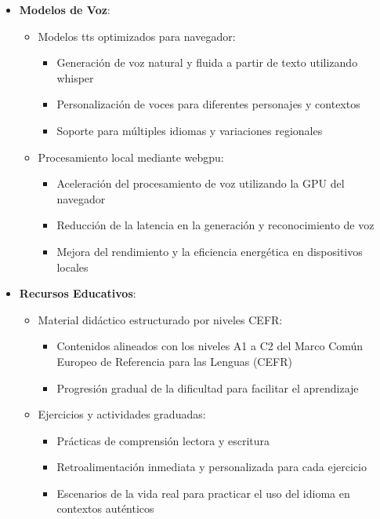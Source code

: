 \begin{itemize}
    \item \textbf{Modelos de Voz}:
        \begin{itemize}
            \item Modelos \gls{tts} optimizados para navegador:
            \begin{itemize}
                \item Generación de voz natural y fluida a partir de texto utilizando \gls{whisper}
                \item Personalización de voces para diferentes personajes y contextos
                \item Soporte para múltiples idiomas y variaciones regionales
            \end{itemize}
            
            \item Procesamiento local mediante \gls{webgpu}:
            \begin{itemize}
                \item Aceleración del procesamiento de voz utilizando la GPU del navegador
                \item Reducción de la latencia en la generación y reconocimiento de voz
                \item Mejora del rendimiento y la eficiencia energética en dispositivos locales
            \end{itemize}
        \end{itemize}
        
        \item \textbf{Recursos Educativos}:
        \begin{itemize}
            \item Material didáctico estructurado por niveles CEFR:
            \begin{itemize}
                \item Contenidos alineados con los niveles A1 a C2 del Marco Común Europeo de Referencia para las Lenguas (CEFR)
                \item Progresión gradual de la dificultad para facilitar el aprendizaje
            \end{itemize}
            
            \item Ejercicios y actividades graduadas:
            \begin{itemize}
                \item Prácticas de comprensión lectora y escritura
                \item Retroalimentación inmediata y personalizada para cada ejercicio
                \item Escenarios de la vida real para practicar el uso del idioma en contextos auténticos
            \end{itemize}
        \end{itemize}
\end{itemize}
